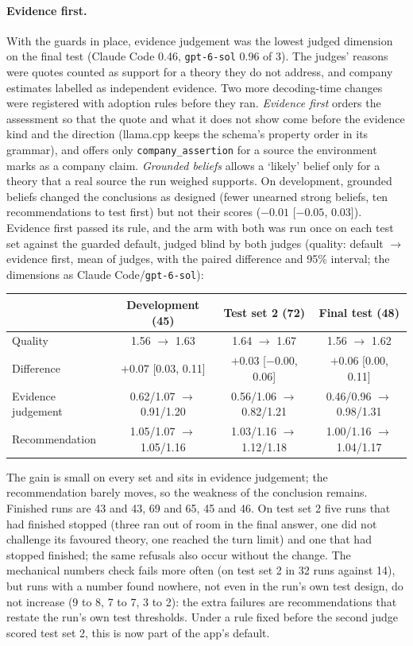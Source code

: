 \paragraph{Evidence first.} With the guards in place, evidence judgement was the lowest judged dimension on the final
test (Claude Code 0.46, \texttt{gpt-6-sol} 0.96 of 3). The judges' reasons were quotes counted as support for a theory they do not
address, and company estimates labelled as independent evidence. Two more decoding-time changes were registered with
adoption rules before they ran. \emph{Evidence first} orders the assessment so that the quote and what it does not
show come before the evidence kind and the direction (llama.cpp keeps the schema's property order in its grammar), and
offers only \texttt{company\_assertion} for a source the environment marks as a company claim. \emph{Grounded beliefs}
allows a `likely' belief only for a theory that a real source the run weighed supports. On development, grounded
beliefs changed the conclusions as designed (fewer unearned strong beliefs, ten recommendations to test first) but not
their scores ($-0.01$ [$-0.05$, 0.03]). Evidence first passed its rule, and the arm with both was run once on each test
set against the guarded default, judged blind by both judges (quality: default $\rightarrow$ evidence first, mean of
judges, with the paired difference and 95\% interval; the dimensions as Claude Code/\texttt{gpt-6-sol}):

\begin{center}
\small\begin{tabular}{@{}lccc@{}}
\toprule
 & Development (45) & Test set 2 (72) & Final test (48)\\
\midrule
Quality & 1.56 $\rightarrow$ 1.63 & 1.64 $\rightarrow$ 1.67 & 1.56 $\rightarrow$ 1.62\\
Difference & $+0.07$ [0.03, 0.11] & $+0.03$ [$-0.00$, 0.06] & $+0.06$ [0.00, 0.11]\\
Evidence judgement & 0.62/1.07 $\rightarrow$ 0.91/1.20 & 0.56/1.06 $\rightarrow$ 0.82/1.21 & 0.46/0.96 $\rightarrow$ 0.98/1.31\\
Recommendation & 1.05/1.07 $\rightarrow$ 1.05/1.16 & 1.03/1.16 $\rightarrow$ 1.12/1.18 & 1.00/1.16 $\rightarrow$ 1.04/1.17\\
\bottomrule
\end{tabular}
\end{center}

The gain is small on every set and sits in evidence judgement; the recommendation barely moves, so the weakness of
the conclusion remains. Finished runs are 43 and 43, 69 and 65, 45 and 46. On test set 2 five runs that had finished
stopped (three ran out of room in the final answer, one did not challenge its favoured theory, one reached the turn
limit) and one that had stopped finished; the same refusals also occur without the change. The
mechanical numbers check fails more often (on test set 2 in 32 runs against 14), but runs with a number found nowhere,
not even in the run's own test design, do not increase (9 to 8, 7 to 7, 3 to 2): the extra failures are recommendations
that restate the run's own test thresholds. Under a rule fixed before the second judge scored test set 2, this is now
part of the app's default.

